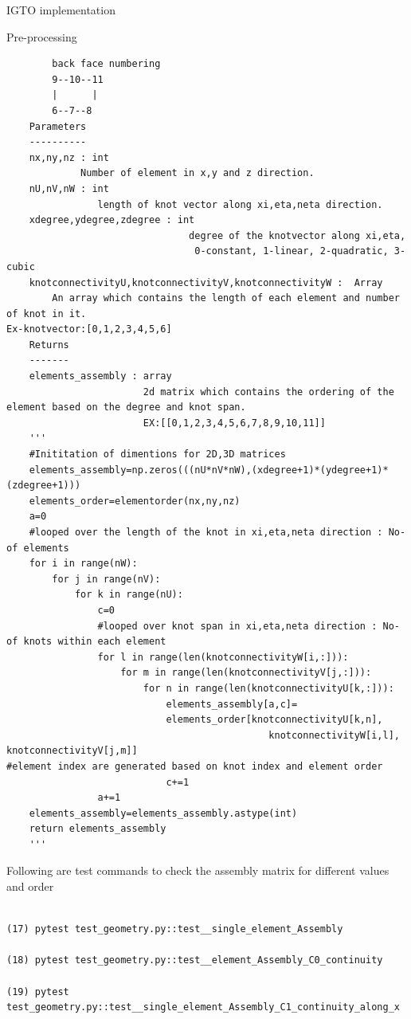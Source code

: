 \documentclass[a4paper,12pt,times]{article}
\begin{document}
\begin{section}{IGTO implementation}
\begin{subsection}{Pre-processing}
\begin{lstlisting}
        back face numbering
        9--10--11
        |      |
        6--7--8
    Parameters
    ----------
    nx,ny,nz : int
             Number of element in x,y and z direction.
    nU,nV,nW : int
                length of knot vector along xi,eta,neta direction.
    xdegree,ydegree,zdegree : int
                                degree of the knotvector along xi,eta,
                                 0-constant, 1-linear, 2-quadratic, 3-cubic
    knotconnectivityU,knotconnectivityV,knotconnectivityW :  Array
  		An array which contains the length of each element and number of knot in it.                                                              Ex-knotvector:[0,1,2,3,4,5,6]         
    Returns
    -------
    elements_assembly : array
                        2d matrix which contains the ordering of the element based on the degree and knot span.
                        EX:[[0,1,2,3,4,5,6,7,8,9,10,11]]
    '''
    #Inititation of dimentions for 2D,3D matrices
    elements_assembly=np.zeros(((nU*nV*nW),(xdegree+1)*(ydegree+1)*(zdegree+1)))
    elements_order=elementorder(nx,ny,nz)
    a=0 
    #looped over the length of the knot in xi,eta,neta direction : No-of elements
    for i in range(nW):
        for j in range(nV):
            for k in range(nU):
                c=0
                #looped over knot span in xi,eta,neta direction : No-of knots within each element 
                for l in range(len(knotconnectivityW[i,:])):
                    for m in range(len(knotconnectivityV[j,:])):
                        for n in range(len(knotconnectivityU[k,:])):
                            elements_assembly[a,c]=
                            elements_order[knotconnectivityU[k,n],
                            			      knotconnectivityW[i,l], 				knotconnectivityV[j,m]]  
#element index are generated based on knot index and element order
                            c+=1
                a+=1         
    elements_assembly=elements_assembly.astype(int)
    return elements_assembly
    '''

\end{lstlisting}


Following are test commands to check the assembly matrix for different values and order
\begin{lstlisting}

(17) pytest test_geometry.py::test__single_element_Assembly

(18) pytest test_geometry.py::test__element_Assembly_C0_continuity

(19) pytest test_geometry.py::test__single_element_Assembly_C1_continuity_along_x


\end{lstlisting}
\end{subsection}
\end{section}
\end{document}
